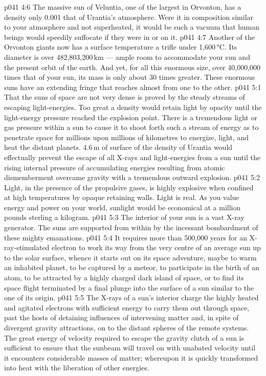 \vs p041 4:6 The massive sun of Veluntia, one of the largest in Orvonton, has a density only 0.001 that of Urantia’s atmosphere. Were it in composition similar to your atmosphere and not superheated, it would be such a vacuum that human beings would speedily suffocate if they were in or on it.
\vs p041 4:7 Another of the Orvonton giants now has a surface temperature a trifle under 1,600\,°C. Its diameter is over 482,803,200\,km --- ample room to accommodate your sun and the present orbit of the earth. And yet, for all this enormous size, over 40,000,000 times that of your sun, its mass is only about 30 times greater. These enormous suns have an extending fringe that reaches almost from one to the other.
\vs p041 5:1 That the suns of space are not very dense is proved by the steady streams of escaping light\hyp{}energies. Too great a density would retain light by opacity until the light\hyp{}energy pressure reached the explosion point. There is a tremendous light or gas pressure within a sun to cause it to shoot forth such a stream of energy as to penetrate space for millions upon millions of kilometres to energize, light, and heat the distant planets. 4.6\,m of surface of the density of Urantia would effectually prevent the escape of all X\hyp{}rays and light\hyp{}energies from a sun until the rising internal pressure of accumulating energies resulting from atomic dismemberment overcame gravity with a tremendous outward explosion.
\vs p041 5:2 Light, in the presence of the propulsive gases, is highly explosive when confined at high temperatures by opaque retaining walls. Light is real. As you value energy and power on your world, sunlight would be economical at a million pounds sterling a kilogram.
\vs p041 5:3 The interior of your sun is a vast X\hyp{}ray generator. The suns are supported from within by the incessant bombardment of these mighty emanations.
\vs p041 5:4 It requires more than 500,000 years for an X\hyp{}ray\hyp{}stimulated electron to work its way from the very centre of an average sun up to the solar surface, whence it starts out on its space adventure, maybe to warm an inhabited planet, to be captured by a meteor, to participate in the birth of an atom, to be attracted by a highly charged dark island of space, or to find its space flight terminated by a final plunge into the surface of a sun similar to the one of its origin.
\vs p041 5:5 The X\hyp{}rays of a sun’s interior charge the highly heated and agitated electrons with sufficient energy to carry them out through space, past the hosts of detaining influences of intervening matter and, in spite of divergent gravity attractions, on to the distant spheres of the remote systems. The great energy of velocity required to escape the gravity clutch of a sun is sufficient to ensure that the sunbeam will travel on with unabated velocity until it encounters considerable masses of matter; whereupon it is quickly transformed into heat with the liberation of other energies.
